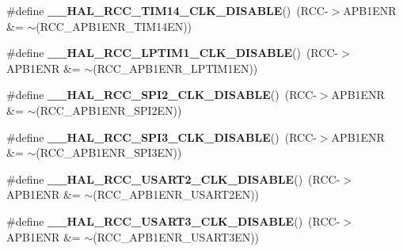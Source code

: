 \begin{DoxyCompactItemize}
\mbox{\label{group___r_c_c_ex___peripheral___clock___enable___disable_ga492911cce1e54350519e7793c897102b}} 
\#define {\bfseries \+\_\+\+\_\+\+H\+A\+L\+\_\+\+R\+C\+C\+\_\+\+T\+I\+M14\+\_\+\+C\+L\+K\+\_\+\+D\+I\+S\+A\+B\+LE}()~(R\+CC-\/$>$A\+P\+B1\+E\+NR \&= $\sim$(R\+C\+C\+\_\+\+A\+P\+B1\+E\+N\+R\+\_\+\+T\+I\+M14\+EN))
\item 
\mbox{\label{group___r_c_c_ex___peripheral___clock___enable___disable_gaed03071c92bed23b141d05c8409893aa}} 
\#define {\bfseries \+\_\+\+\_\+\+H\+A\+L\+\_\+\+R\+C\+C\+\_\+\+L\+P\+T\+I\+M1\+\_\+\+C\+L\+K\+\_\+\+D\+I\+S\+A\+B\+LE}()~(R\+CC-\/$>$A\+P\+B1\+E\+NR \&= $\sim$(R\+C\+C\+\_\+\+A\+P\+B1\+E\+N\+R\+\_\+\+L\+P\+T\+I\+M1\+EN))
\item 
\mbox{\label{group___r_c_c_ex___peripheral___clock___enable___disable_gabb56a85a6424a60da8edc681f3a1c918}} 
\#define {\bfseries \+\_\+\+\_\+\+H\+A\+L\+\_\+\+R\+C\+C\+\_\+\+S\+P\+I2\+\_\+\+C\+L\+K\+\_\+\+D\+I\+S\+A\+B\+LE}()~(R\+CC-\/$>$A\+P\+B1\+E\+NR \&= $\sim$(R\+C\+C\+\_\+\+A\+P\+B1\+E\+N\+R\+\_\+\+S\+P\+I2\+EN))
\item 
\mbox{\label{group___r_c_c_ex___peripheral___clock___enable___disable_gadc6ab93c1c538a7f2ee24a85a6831274}} 
\#define {\bfseries \+\_\+\+\_\+\+H\+A\+L\+\_\+\+R\+C\+C\+\_\+\+S\+P\+I3\+\_\+\+C\+L\+K\+\_\+\+D\+I\+S\+A\+B\+LE}()~(R\+CC-\/$>$A\+P\+B1\+E\+NR \&= $\sim$(R\+C\+C\+\_\+\+A\+P\+B1\+E\+N\+R\+\_\+\+S\+P\+I3\+EN))
\item 
\mbox{\label{group___r_c_c_ex___peripheral___clock___enable___disable_ga1edc6c83fbebf8b4265ef9500aa04b04}} 
\#define {\bfseries \+\_\+\+\_\+\+H\+A\+L\+\_\+\+R\+C\+C\+\_\+\+U\+S\+A\+R\+T2\+\_\+\+C\+L\+K\+\_\+\+D\+I\+S\+A\+B\+LE}()~(R\+CC-\/$>$A\+P\+B1\+E\+NR \&= $\sim$(R\+C\+C\+\_\+\+A\+P\+B1\+E\+N\+R\+\_\+\+U\+S\+A\+R\+T2\+EN))
\item 
\mbox{\label{group___r_c_c_ex___peripheral___clock___enable___disable_ga5b0866dac14f73ddeafa6308ac447bec}} 
\#define {\bfseries \+\_\+\+\_\+\+H\+A\+L\+\_\+\+R\+C\+C\+\_\+\+U\+S\+A\+R\+T3\+\_\+\+C\+L\+K\+\_\+\+D\+I\+S\+A\+B\+LE}()~(R\+CC-\/$>$A\+P\+B1\+E\+NR \&= $\sim$(R\+C\+C\+\_\+\+A\+P\+B1\+E\+N\+R\+\_\+\+U\+S\+A\+R\+T3\+EN))

\end{DoxyCompactItemize}
